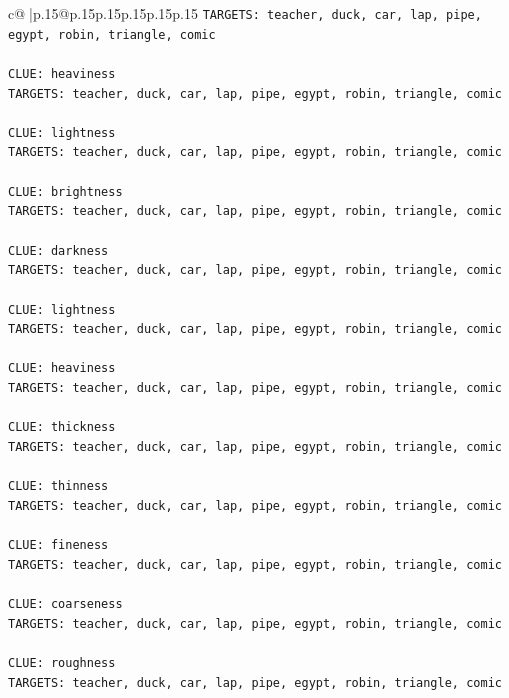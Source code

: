 \documentclass{article}
\begin{document}
{\begin{supertabular}{c@{$\;$}|p{.15\linewidth}@{}p{.15\linewidth}p{.15\linewidth}p{.15\linewidth}p{.15\linewidth}p{.15\linewidth}}
{{{\texttt{TARGETS: teacher, duck, car, lap, pipe, egypt, robin, triangle, comic} \\
\\ 
\texttt{CLUE: heaviness} \\
\texttt{TARGETS: teacher, duck, car, lap, pipe, egypt, robin, triangle, comic} \\
\\ 
\texttt{CLUE: lightness} \\
\texttt{TARGETS: teacher, duck, car, lap, pipe, egypt, robin, triangle, comic} \\
\\ 
\texttt{CLUE: brightness} \\
\texttt{TARGETS: teacher, duck, car, lap, pipe, egypt, robin, triangle, comic} \\
\\ 
\texttt{CLUE: darkness} \\
\texttt{TARGETS: teacher, duck, car, lap, pipe, egypt, robin, triangle, comic} \\
\\ 
\texttt{CLUE: lightness} \\
\texttt{TARGETS: teacher, duck, car, lap, pipe, egypt, robin, triangle, comic} \\
\\ 
\texttt{CLUE: heaviness} \\
\texttt{TARGETS: teacher, duck, car, lap, pipe, egypt, robin, triangle, comic} \\
\\ 
\texttt{CLUE: thickness} \\
\texttt{TARGETS: teacher, duck, car, lap, pipe, egypt, robin, triangle, comic} \\
\\ 
\texttt{CLUE: thinness} \\
\texttt{TARGETS: teacher, duck, car, lap, pipe, egypt, robin, triangle, comic} \\
\\ 
\texttt{CLUE: fineness} \\
\texttt{TARGETS: teacher, duck, car, lap, pipe, egypt, robin, triangle, comic} \\
\\ 
\texttt{CLUE: coarseness} \\
\texttt{TARGETS: teacher, duck, car, lap, pipe, egypt, robin, triangle, comic} \\
\\ 
\texttt{CLUE: roughness} \\
\texttt{TARGETS: teacher, duck, car, lap, pipe, egypt, robin, triangle, comic} \\
}}}
\end{supertabular}}
\end{document}
